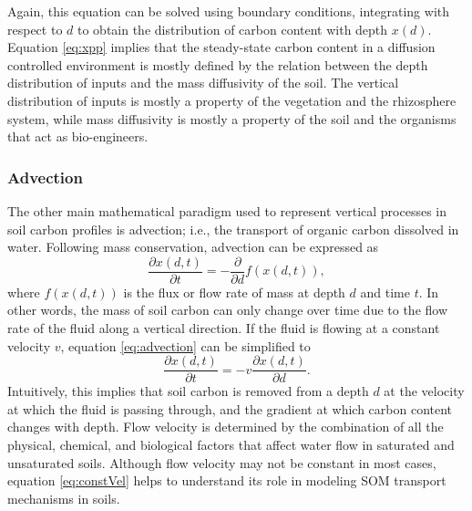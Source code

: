 \documentclass[11pt, oneside, a4paper]{article}   	%
\begin{document}
Again, this equation can be solved using boundary conditions, integrating with respect to $d$ to obtain the distribution of carbon content with depth $x(d)$. Equation \ref{eq:xpp} implies that the steady-state carbon content in a diffusion controlled environment is mostly defined by the relation between the depth distribution of inputs and the mass diffusivity of the soil. The vertical distribution of inputs is mostly a property of the vegetation and the rhizosphere system, while mass diffusivity is mostly a property of the soil and the organisms that act as bio-engineers. 

\subsubsection{Advection}
The other main mathematical paradigm used to represent vertical processes in soil carbon profiles is advection; i.e., the transport of organic carbon dissolved in water. 
Following mass conservation, advection can be expressed as
\begin{equation} \label{eq:advection}
\frac{\partial x(d, t)}{\partial t} = - \frac{\partial }{\partial d} f(x(d, t)),
\end{equation}
where $f(x(d, t))$ is the flux or flow rate of mass at depth $d$ and time $t$. In other words, the mass of soil carbon can only change over time due to the flow rate of the fluid along a vertical direction. If the fluid is flowing at a constant velocity $v$, equation \ref{eq:advection} can be simplified to
\begin{equation} \label{eq:constVel}
\frac{\partial x(d, t)}{\partial t} = -v \frac{\partial x(d, t)}{\partial d}.
\end{equation}
Intuitively, this implies that soil carbon is removed from a depth $d$ at the velocity at which the fluid is passing through, and the gradient at which carbon content changes with depth. Flow velocity is determined by the combination of all the physical, chemical, and biological factors that affect water flow in saturated and unsaturated soils. Although flow velocity may not be constant in most cases, equation \ref{eq:constVel} helps to understand its role in modeling SOM transport mechanisms in soils.  
\end{document}
